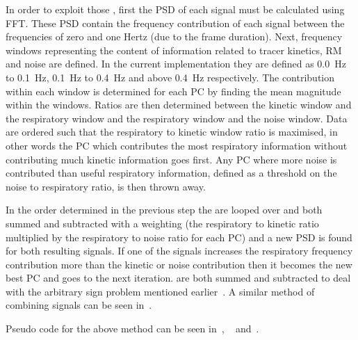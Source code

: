                     In order to exploit those , first the \gls{PSD} of each signal must be calculated using \gls{FFT}. These \gls{PSD} contain the frequency contribution of each signal between the frequencies of zero and one Hertz (due to the frame duration). Next, frequency windows representing the content of information related to tracer kinetics, \gls{RM} and noise are defined. In the current implementation they are defined as \SI{0.0}{\hertz} to \SI{0.1}{\hertz}, \SI{0.1}{\hertz} to \SI{0.4}{\hertz} and above \SI{0.4}{\hertz} respectively. The contribution within each window is determined for each \gls{PC} by finding the mean magnitude within the windows. Ratios are then determined between the kinetic window and the respiratory window and the respiratory window and the noise window. Data are ordered such that the respiratory to kinetic window ratio is maximised, in other words the \gls{PC} which contributes the most respiratory information without contributing much kinetic information goes first. Any \gls{PC} where more noise is contributed than useful respiratory information, defined as a threshold on the noise to respiratory ratio, is then thrown away.
                    
                    In the order determined in the previous step the  are looped over and both summed and subtracted with a weighting (the respiratory to kinetic ratio multiplied by the respiratory to noise ratio for each \gls{PC}) and a new \gls{PSD} is found for both resulting signals. If one of the signals increases the respiratory frequency contribution more than the kinetic or noise contribution then it becomes the new best \gls{PC} and goes to the next iteration.  are both summed and subtracted to deal with the arbitrary sign problem mentioned earlier~. A similar method of combining signals can be seen in~.
                    
                    Pseudo code for the above method can be seen in~, ~ and~.
                    
